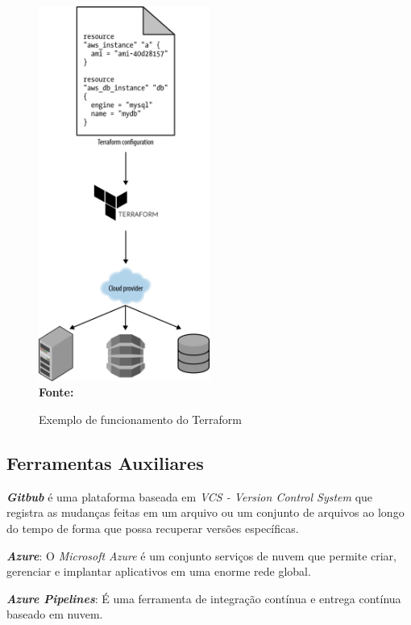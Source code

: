   \begin{figure}[ht]
	\centering	
	\caption[\hspace{0.1cm}Exemplo de funcionamento do Terraform]{Exemplo de funcionamento do Terraform}
	\vspace{-0.4cm}
	\includegraphics[width=0.5\textwidth]{figuras/terraform-working.png}
	 \vspace{-0.2cm}
	\\\textbf{\footnotesize Fonte: \cite{oreilly}}
	\label{fig:figura7}
\end{figure}
\vspace{-0.5cm}

\subsection{Ferramentas Auxiliares}

\textbf{\textit{Gitbub}} é uma plataforma baseada em \textit{VCS - Version Control System} que registra as mudanças feitas em um arquivo ou um conjunto de arquivos ao longo do tempo de forma que possa recuperar versões específicas. 

\textbf{\textit{Azure}}: O \textit{Microsoft Azure} é um conjunto serviços de nuvem que permite criar, gerenciar e implantar aplicativos em uma enorme rede global. 

\textbf{\textit{Azure Pipelines}}: É uma ferramenta de integração contínua e entrega contínua baseado em nuvem.



 